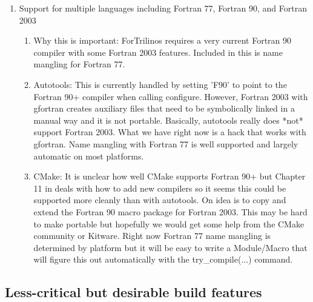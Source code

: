 \documentclass[pdf,ps2pdf,11pt]{SANDreport}
\begin{document}
\begin{enumerate}
{}\item Support for multiple languages including Fortran 77, Fortran
90, and Fortran 2003

  \begin{enumerate}

  {}\item Why this is important: ForTrilinos requires a very current
  Fortran 90 compiler with some Fortran 2003 features.  Included in
  this is name mangling for Fortran 77.

  {}\item Autotools: This is currently handled by setting 'F90' to
  point to the Fortran 90+ compiler when calling configure.  However,
  Fortran 2003 with gfortran creates auxiliary files that need to be
  symbolically linked in a manual way and it is not portable.
  Basically, autotools really does *not* support Fortran 2003.  What
  we have right now is a hack that works with gfortran.  Name mangling
  with Fortran 77 is well supported and largely automatic on most
  platforms.

  {}\item CMake: It is unclear how well CMake supports Fortran 90+ but
  Chapter 11 in {}\cite{MasteringCMake_fourth} deals with how to add
  new compilers so it seems this could be supported more cleanly than
  with autotools. On idea is to copy and extend the Fortran 90 macro
  package for Fortran 2003.  This may be hard to make portable but
  hopefully we would get some help from the CMake community or Kitware.
  Right now Fortran 77 name mangling is determined by platform but it
  will be easy to write a Module/Macro that will figure this out
  automatically with the try\_compile(...) command.

  \end{enumerate}

\end{enumerate}


%
{}\subsection{Less-critical but desirable build features}
%
\end{document}
